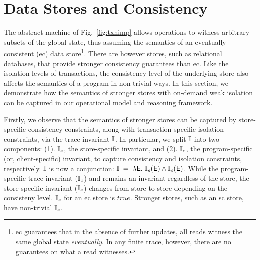 \section{Data Stores and Consistency}
\label{sec:store-consistency}

The abstract machine
of Fig.~\ref{fig:txnimp} allows operations to witness arbitrary
subsets of the global state, thus assuming the semantics of an
eventually consistent ({\sc ec}) data store\footnote{{\sc ec}
guarantees that in the absence of further updates, all reads witness
the same global state \emph{eventually}. In any finite trace, however,
there are no guarantees on what a read witnesses.}. There are however
stores, such as relational databases, that provide stronger
consistency guarantees than {\sc ec}. Like the isolation levels of
transactions, the consistency level of the underlying store also
affects the semantics of a program in non-trivial ways. In this
section, we demonstrate how the semantics of stronger stores with
on-demand weak isolation can be captured in our operational model
and reasoning framework.


Firstly, we observe that the semantics of stronger stores can be
captured by store-specific consistency constraints, along with
transaction-specific isolation constraints, via the trace invariant
$\mathbb{I}$. In particular, we split $\mathbb{I}$ into two components: (1).  $\mathbb{I}_s$,
the store-specific invariant, and (2). $\mathbb{I}_c$, the program-specific
(or, client-specific) invariant, to capture consistency and isolation
constraints, respectively. $\mathbb{I}$ is now a conjunction:
  $\mathbb{I} \;=\; \lambda\textsf{E}.~\mathbb{I}_s(\textsf{E}) \wedge \mathbb{I}_c(\textsf{E})$.
While the program-specific trace invariant ($\mathbb{I}_c$) and remains an
invariant regardless of the store, the store specific invariant
($\mathbb{I}_s$) changes from store to store depending on the consisteny
level. $\mathbb{I}_s$ for an {\sc ec} store is $true$. Stronger stores, such
as an {\sc sc} store, have non-trivial $\mathbb{I}_s$.

